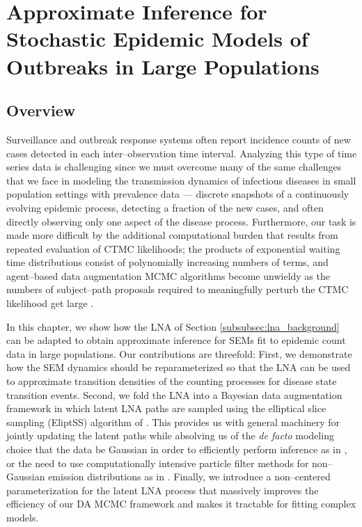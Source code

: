 \chapter{Approximate Inference for Stochastic Epidemic Models of Outbreaks in Large Populations}
\label{chap:lna_for_sems}

\section{Overview}
\label{sec:lna_overview}

Surveillance and outbreak response systems often report incidence counts of new cases detected in each inter--observation time interval. Analyzing this type of time series data is challenging since we must overcome many of the same challenges that we face in modeling the transmission dynamics of infectious diseases in small population settings with prevalence data --- discrete snapshots of a continuously evolving epidemic process, detecting a fraction of the new cases, and often directly observing only one aspect of the disease process. Furthermore, our task is made more difficult by the additional computational burden that results from repeated evaluation of CTMC likelihoods; the products of exponential waiting time distributions consist of polynomially increasing numbers of terms, and agent--based data augmentation MCMC algorithms become unwieldy as the numbers of subject--path proposals required to meaningfully perturb the CTMC likelihood get large \citep{fintzi2017efficient}. 

In this chapter, we show how the LNA of Section \ref{subsubsec:lna_background} can be adapted to obtain approximate inference for SEMs fit to epidemic count data in large populations. Our contributions are threefold: First, we demonstrate how the SEM dynamics should be reparameterized so that the LNA can be used to approximate transition densities of the counting processes for disease state transition events. Second, we fold the LNA into a Bayesian data augmentation framework in which latent LNA paths are sampled using the elliptical slice sampling (EliptSS) algorithm of \cite{murray2010}. This provides us with general machinery for jointly updating the latent paths while absolving us of the \textit{de facto} modeling choice that the data be Gaussian in order to efficiently perform inference as in \cite{fearnhead2014,komorowski2009}, or the need to use computationally intensive particle filter methods for non--Gaussian emission distributions as in \cite{golightly2015delayed}. Finally, we introduce a non--centered parameterization for the latent LNA process that massively improves the efficiency of our DA MCMC framework and makes it tractable for fitting complex models. 

